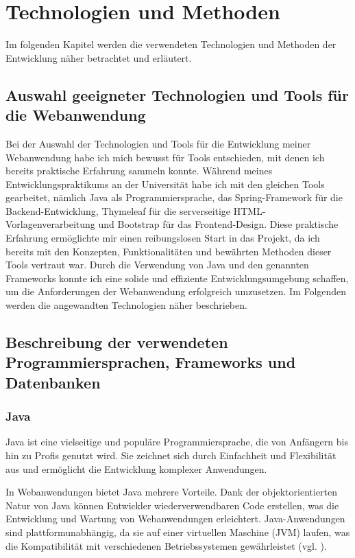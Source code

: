 \documentclass[fontsize=12pt,openright,oneside,paper=a4,BCOR=1cm]{scrbook}
\begin{document}
%
%
\renewcommand{\cleardoublepage}{}
\chapter{Technologien und Methoden}

Im folgenden Kapitel werden die verwendeten Technologien und Methoden der Entwicklung näher betrachtet und erläutert.

\section{Auswahl geeigneter Technologien und Tools für die Webanwendung}


Bei der Auswahl der Technologien und Tools für die Entwicklung meiner Webanwendung habe ich mich bewusst für Tools entschieden, mit denen ich bereits praktische Erfahrung sammeln konnte. Während meines Entwicklungspraktikums an der Universität habe ich mit den gleichen Tools gearbeitet, nämlich Java als Programmiersprache, das Spring-Framework für die Backend-Entwicklung, Thymeleaf für die serverseitige HTML-Vorlagenverarbeitung und Bootstrap für das Frontend-Design. Diese praktische Erfahrung ermöglichte mir einen reibungslosen Start in das Projekt, da ich bereits mit den Konzepten, Funktionalitäten und bewährten Methoden dieser Tools vertraut war. Durch die Verwendung von Java und den genannten Frameworks konnte ich eine solide und effiziente Entwicklungsumgebung schaffen, um die Anforderungen der Webanwendung erfolgreich umzusetzen.
Im Folgenden werden die angewandten Technologien näher beschrieben.

\section{Beschreibung der verwendeten Programmiersprachen, Frameworks und Datenbanken}

\subsection{Java}
Java ist eine vielseitige und populäre Programmiersprache, die von Anfängern bis hin zu Profis genutzt wird. Sie zeichnet sich durch Einfachheit und Flexibilität aus und ermöglicht die Entwicklung komplexer Anwendungen.

In Webanwendungen bietet Java mehrere Vorteile. Dank der objektorientierten Natur von Java können Entwickler wiederverwendbaren Code erstellen, was die Entwicklung und Wartung von Webanwendungen erleichtert. Java-Anwendungen sind plattformunabhängig, da sie auf einer virtuellen Maschine (JVM) laufen, was die Kompatibilität mit verschiedenen Betriebssystemen gewährleistet (vgl. \cite{scalosoftjava}).
\end{document}
